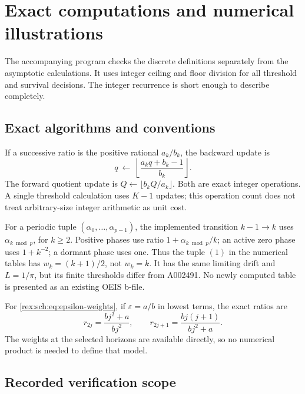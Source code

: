 \section{Exact computations and numerical illustrations}
\label{rex:sch:sec:computations}

The accompanying program checks the discrete definitions separately
from the asymptotic calculations. It uses integer ceiling and floor
division for all threshold and survival decisions. The integer
recurrence is short enough to describe completely.

\subsection{Exact algorithms and conventions}

If a successive ratio is the positive rational $a_k/b_k$, the
backward update is
\begin{equation}\label{rex:sch:eq:algorithm}
 q\ \longleftarrow\
 \left\lfloor\frac{a_kq+b_k-1}{b_k}\right\rfloor.
\end{equation}
The forward quotient update is
$Q\leftarrow\lfloor b_kQ/a_k\rfloor$. Both are exact integer
operations. A single threshold calculation uses $K-1$ updates;
this operation count does not treat arbitrary-size integer
arithmetic as unit cost.

For a periodic tuple $(\alpha_0,\ldots,\alpha_{p-1})$, the
implemented transition $k-1\to k$ uses $\alpha_{k\bmod p}$,
for $k\geq2$. Positive phases use ratio $1+\alpha_{k\bmod p}/k$;
an active zero phase uses $1+k^{-2}$; a dormant phase uses one.
Thus the tuple $(1)$ in the numerical tables has
$w_k=(k+1)/2$, not $w_k=k$. It has the same limiting drift and
$L=1/\pi$, but its finite thresholds differ from A002491.
No newly computed table is presented as an existing OEIS b-file.

For \eqref{rex:sch:eq:epsilon-weights}, if $\varepsilon=a/b$ in lowest
terms, the exact ratios are
\begin{equation}\label{rex:sch:eq:epsilon-rational-ratios}
 r_{2j}=\frac{bj^2+a}{bj^2},\qquad
 r_{2j+1}=\frac{bj(j+1)}{bj^2+a}.
\end{equation}
The weights at the selected horizons are available directly, so
no numerical product is needed to define that model.

\subsection{Recorded verification scope}

